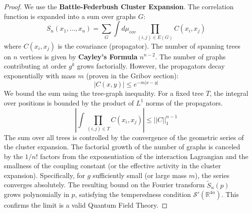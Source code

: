 \begin{proof}
We use the \textbf{Battle-Federbush Cluster Expansion}. The correlation function is expanded into a sum over graphs $G$:
\begin{equation}
S_n(x_1, \dots, x_n) = \sum_{G} \int d\mu_{cov} \prod_{(i,j) \in E(G)} C(x_i, x_j)
\end{equation}
where $C(x_i, x_j)$ is the covariance (propagator).
The number of spanning trees on $n$ vertices is given by \textbf{Cayley's Formula} $n^{n-2}$. The number of graphs contributing at order $g^k$ grows factorially.
However, the propagators decay exponentially with mass $m$ (proven in the Gribov section):
\begin{equation}
|C(x,y)| \le e^{-m|x-y|}
\end{equation}
We bound the sum using the tree-graph inequality. For a fixed tree $T$, the integral over positions is bounded by the product of $L^1$ norms of the propagators.
\begin{equation}
\left| \int \prod_{(i,j) \in T} C(x_i, x_j) \right| \le ||C||_1^{n-1}
\end{equation}
The sum over all trees is controlled by the convergence of the geometric series of the cluster expansion. The factorial growth of the number of graphs is canceled by the $1/n!$ factors from the exponentiation of the interaction Lagrangian and the smallness of the coupling constant (or the effective activity in the cluster expansion).
Specifically, for $g$ sufficiently small (or large mass $m$), the series converges absolutely. The resulting bound on the Fourier transform $\tilde{S}_n(p)$ grows polynomially in $p$, satisfying the temperedness condition $\mathcal{S}'(\mathbb{R}^{4n})$. This confirms the limit is a valid Quantum Field Theory.
\end{proof}


